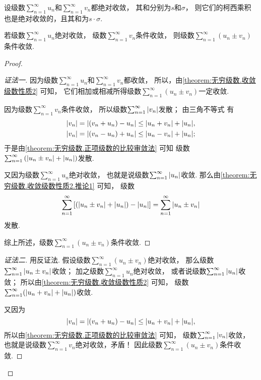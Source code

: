 \begin{theorem}\label{theorem:无穷级数.绝对收敛级数的柯西乘积必收敛}
设级数\(\sum_{n=1}^\infty u_n\)和\(\sum_{n=1}^\infty v_n\)都绝对收敛，
其和分别为\(s\)和\(\sigma\)，
则它们的柯西乘积也是绝对收敛的，且其和为\(s \cdot \sigma\).
\end{theorem}

\begin{proposition}\label{theorem:绝对收敛.命题1}
若级数\(\sum_{n=1}^\infty u_n\)绝对收敛，
级数\(\sum_{n=1}^\infty v_n\)条件收敛，
则级数\(\sum_{n=1}^\infty (u_n \pm v_n)\)条件收敛.
\begin{proof}\let\qed\relax
\begin{proof}[证法一]
因为级数\(\sum_{n=1}^\infty u_n\)和\(\sum_{n=1}^\infty v_n\)都收敛，
所以，由\cref{theorem:无穷级数.收敛级数性质2} 可知，
它们相加或相减所得级数\(\sum_{n=1}^\infty (u_n \pm v_n)\)一定收敛.

因为级数\(\sum_{n=1}^\infty v_n\)条件收敛，
所以级数\(\sum_{n=1}^\infty \abs{v_n}\)发散；
由三角不等式  有\begin{align*}
	\abs{v_n}
	= \abs{(v_n + u_n) - u_n}
	\leq \abs{u_n + v_n} + \abs{u_n}, \\
	\abs{v_n}
	= \abs{(v_n - u_n) + u_n}
	\leq \abs{u_n - v_n} + \abs{u_n};
\end{align*}
于是由\cref{theorem:无穷级数.正项级数的比较审敛法} 可知
级数\(\sum_{n=1}^\infty \left( \abs{u_n \pm v_n} + \abs{u_n} \right)\)发散.

又因为级数\(\sum_{n=1}^\infty u_n\)绝对收敛，
也就是说级数\(\sum_{n=1}^\infty \abs{u_n}\)收敛.
那么由\cref{theorem:无穷级数.收敛级数性质2.推论1} 可知，
级数\[
	\sum_{n=1}^\infty \left[
		\left( \abs{u_n \pm v_n} + \abs{u_n} \right) - \abs{u_n}
	\right]
	= \sum_{n=1}^\infty \abs{u_n \pm v_n}
\]发散.

综上所述，级数\(\sum_{n=1}^\infty (u_n \pm v_n)\)条件收敛.
\end{proof}
\begin{proof}[证法二]
用反证法.
假设级数\(\sum_{n=1}^\infty (u_n \pm v_n)\)绝对收敛，
那么级数\(\sum_{n=1}^\infty \abs{u_n \pm v_n}\)收敛；
加之级数\(\sum_{n=1}^\infty u_n\)绝对收敛，
或者说级数\(\sum_{n=1}^\infty \abs{u_n}\)收敛；
所以由\cref{theorem:无穷级数.收敛级数性质2} 可知，
级数\(\sum_{n=1}^\infty (\abs{u_n + v_n} + \abs{u_n})\)收敛.

又因为\[
	\abs{v_n}
	= \abs{(v_n + u_n) - u_n}
	\leq \abs{u_n + v_n} + \abs{u_n},
\]
所以由\cref{theorem:无穷级数.正项级数的比较审敛法} 可知，
级数\(\sum_{n=1}^\infty \abs{v_n}\)收敛，
也就是说级数\(\sum_{n=1}^\infty v_n\)绝对收敛，矛盾！
因此级数\(\sum_{n=1}^\infty (u_n \pm v_n)\)条件收敛.
\end{proof}
\end{proof}
\end{proposition}

